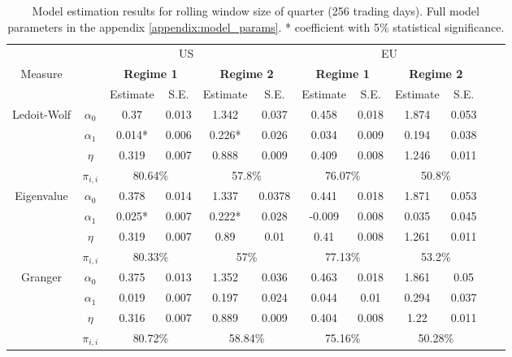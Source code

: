 \documentclass[12pt]{article}
\begin{document}
\begin{table}\small
	\begin{tabular}{cccccc | cccccc}
		& \multicolumn{5}{c}{US} & \multicolumn{4}{c}{EU} \\
		Measure &  & \multicolumn{2}{c}{\bfseries Regime 1} & \multicolumn{2}{c}{\bfseries Regime 2} & \multicolumn{2}{c}{\bfseries Regime 1} & \multicolumn{2}{c}{\bfseries Regime 2} \\
		\hline
		& & Estimate & S.E. & Estimate & S.E. & Estimate & S.E. & Estimate & S.E. \\
		\hline
		\multirow{3}{*}[\normalbaselineskip]{Ledoit-Wolf} & $\alpha_0$ & 0.37 & 0.013 & 1.342 & 0.037 & 0.458 & 0.018 & 1.874 & 0.053\\
		& $\alpha_1$ & 0.014* & 0.006 & 0.226* & 0.026 & 0.034 & 0.009 & 0.194 & 0.038\\
		& $\eta$ & 0.319 & 0.007 & 0.888 & 0.009 & 0.409 & 0.008 & 1.246 & 0.011\\
		& $\pi_{i,i}$ &  \multicolumn{2}{c}{80.64\%} & \multicolumn{2}{c|}{57.8\%} & \multicolumn{2}{c}{76.07\%} & \multicolumn{2}{c}{50.8\%}\\
		\hline
		\multirow{3}{*}[\normalbaselineskip]{Eigenvalue} & $\alpha_0$ & 0.378 & 0.014 & 1.337 & 0.0378 & 0.441 & 0.018 & 1.871 & 0.053\\
		& $\alpha_1$ & 0.025* & 0.007 & 0.222* & 0.028 & -0.009 & 0.008 & 0.035 & 0.045\\
		& $\eta$ & 0.319 & 0.007 & 0.89 & 0.01 & 0.41 & 0.008 & 1.261 & 0.011\\
		& $\pi_{i,i}$ &  \multicolumn{2}{c}{80.33\%} & \multicolumn{2}{c|}{57\%} & \multicolumn{2}{c}{77.13\%} & \multicolumn{2}{c}{53.2\%}\\
		\hline
		\multirow{3}{*}[\normalbaselineskip]{Granger} & $\alpha_0$ & 0.375 & 0.013 & 1.352 & 0.036 & 0.463 & 0.018 & 1.861 & 0.05\\
		& $\alpha_1$ & 0.019 & 0.007 & 0.197 & 0.024 & 0.044 & 0.01 & 0.294 & 0.037\\
		& $\eta$ & 0.316 & 0.007 & 0.889 & 0.009 & 0.404 & 0.008 & 1.22 & 0.011\\
		& $\pi_{i,i}$ &  \multicolumn{2}{c}{80.72\%} & \multicolumn{2}{c|}{58.84\%}& \multicolumn{2}{c}{75.16\%} & \multicolumn{2}{c}{50.28\%}\\
		\hline
	\end{tabular}
	\caption{Model estimation results for rolling window size of quarter (256 trading days). Full model parameters in the appendix \ref{appendix:model_params}. * coefficient with 5\% statistical significance.}
	\label{table:model256}
\end{table}
\end{document}
